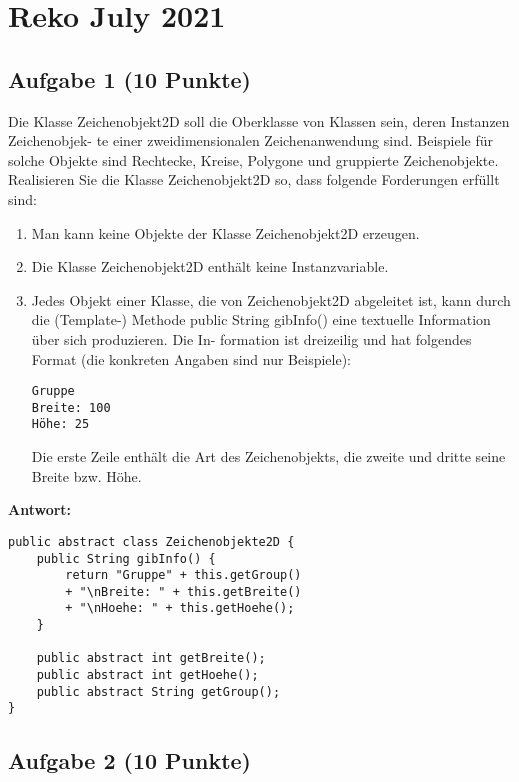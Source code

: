 \chapter{Reko July 2021}

\section{Aufgabe 1 (10 Punkte)}

Die Klasse Zeichenobjekt2D soll die Oberklasse von Klassen sein, deren
Instanzen Zeichenobjek- te einer zweidimensionalen Zeichenanwendung sind.
Beispiele für solche Objekte sind Rechtecke, Kreise, Polygone und gruppierte
Zeichenobjekte. Realisieren Sie die Klasse Zeichenobjekt2D so, dass folgende
Forderungen erfüllt sind:

\begin{enumerate}
    \item Man kann keine Objekte der Klasse Zeichenobjekt2D erzeugen.
    \item Die Klasse Zeichenobjekt2D enthält keine Instanzvariable.
    \item Jedes Objekt einer Klasse, die von Zeichenobjekt2D abgeleitet ist, kann durch
          die (Template-) Methode public String gibInfo() eine textuelle Information über
          sich produzieren. Die In- formation ist dreizeilig und hat folgendes Format
          (die konkreten Angaben sind nur Beispiele):
          \begin{lstlisting}
Gruppe
Breite: 100
Höhe: 25
\end{lstlisting}
          Die erste Zeile enthält die Art des Zeichenobjekts, die zweite und dritte seine
          Breite bzw. Höhe.
\end{enumerate}

\textbf{Antwort:}

\begin{lstlisting}
public abstract class Zeichenobjekte2D {
    public String gibInfo() {
        return "Gruppe" + this.getGroup() 
        + "\nBreite: " + this.getBreite() 
        + "\nHoehe: " + this.getHoehe();
    }

    public abstract int getBreite();
    public abstract int getHoehe();
    public abstract String getGroup();
}
\end{lstlisting}

\section{Aufgabe 2 (10 Punkte)}

